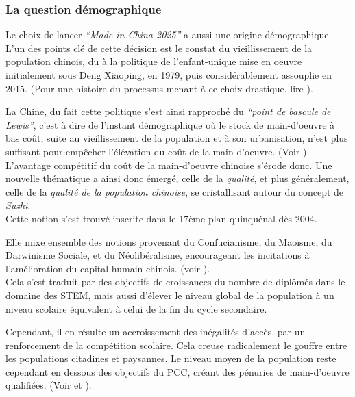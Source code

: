 \documentclass[a4paper]{article}
\begin{document}
\subsubsection{La question démographique}
\label{sec:org2d752fd}
Le choix de lancer \emph{“Made in China 2025”} a aussi une origine démographique.
 L’un des points clé de cette décision est le constat du vieillissement de la
 population chinois, du à la politique de l’enfant-unique mise en oeuvre
 initialement sous Deng Xiaoping, en 1979, puis considérablement assouplie
 en 2015. (Pour une histoire du processus menant à ce choix drastique, lire
 \cite{greenhalgh08_just}).

 La Chine, du fait cette politique s’est ainsi rapproché du \emph{“point de bascule
de Lewis”}, c’est à dire de l’instant démographique où le stock de main-d’oeuvre
à bas coût, suite au vieillissement de la population et à son urbanisation,
n’est plus suffisant pour empêcher l’élévation du coût de la main d’oeuvre.
(Voir \cite{dollar20_china})\\

L’avantage compétitif du coût de la main-d’oeuvre chinoise s’érode donc. Une
nouvelle thématique a ainsi donc émergé, celle de la \emph{qualité}, et plus
généralement, celle de la \emph{qualité de la population chinoise}, se cristallisant
autour du concept de \emph{Suzhi}.\\

Cette notion s’est trouvé inscrite dans le 17ème plan quinquénal dès 2004. 

Elle mixe ensemble des notions provenant du Confucianisme, du Maoïsme, du
Darwinisme Sociale, et du Néolibéralisme, encourageant les incitations à
l’amélioration du capital humain chinois. (voir \cite{greenhalgh10_cultiv}).\\

 Cela s’est traduit par des objectifs de croissances du nombre de diplômés dans
le domaine des STEM, mais aussi d’élever le niveau global de la population à un
niveau scolaire équivalent à celui de la fin du cycle secondaire.

Cependant, il en résulte un accroissement des inégalités d’accès, par un
renforcement de la compétition scolaire. Cela creuse radicalement le gouffre
entre les populations citadines et paysannes. Le niveau moyen de la population
reste cependant en dessous des objectifs du PCC, créant des pénuries de
main-d’oeuvre qualifiées. (Voir \cite{simon09_chinas} et \cite{xiaolan15_chinas}).
\end{document}
